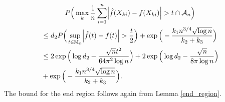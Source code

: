     \begin{multline*}
        P\Big(\max_k \frac{1}{n} \sum_{i=1}^n \abs{\hat{f}(X_{ki}) - f(X_{ki})} > t \cap \mathcal{A}_n \Big) \\
        \begin{aligned}
            &\leq d_2P\Big(\sup_{t \in \mathbb{M}_n} \abs{\hat{f}(t) - f(t)} > \frac{t}{2}\Big) + \exp\Big(- \frac{k_1 n^{3/4} \sqrt{\log n}}{k_2+ k_3} \Big) \\
            &\leq 2\exp\Big(\log d_2 -\frac{\sqrt{n}t^2}{64 \pi^2\log n}\Big) + 2\exp\Big(\log d_2 - \frac{\sqrt{n}}{8\pi\log n}\Big) \\
            &+ \exp\Big(- \frac{k_1 n^{3/4} \sqrt{\log n}}{k_2+ k_3} \Big).
        \end{aligned}
\end{multline*}
The bound for the end region follows again from Lemma \ref{end_region}.

